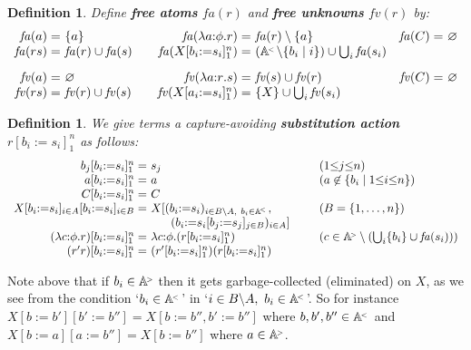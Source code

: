 \documentclass[submission,copyright]{eptcs}
\newtheorem{defn}[thrm]{Definition}
\newcommand{\rtm}{r}
\newcommand{\stm}{s}
\newcommand{\deffont}[1]{\textbf{#1}}
\newcommand{\f}[1]{\ensuremath{\text{$\mathit{#1}$}}}
\newcommand{\lam}[1]{\lambda{#1}.}
\newcommand{\ssm}{:=}
\newcommand{\fa}{\f{fa}}
\newcommand{\fv}{\f{fv}}
\newcommand\atomsdown{\mathbb A^{\hspace{-.3ex}{}_{{}^<}}}
\newcommand\atomsup{\mathbb A^{\hspace{-.3ex}{}_{{}^>}\!}} \newcommand\basesort{\tau}
\begin{document}
\begin{defn}
\label{defn.hole.free.atoms}
Define \deffont{free atoms} $\fa(\rtm)$ and \deffont{free unknowns} $\fv(\rtm)$ by:
\begin{displaymath}
\begin{array}{r@{\ }l@{\qquad}r@{\ }l@{\quad}r@{\ }l}
\fa(a) = & \{ a \}                               
& 
\fa(\lam{a{:}\phi}r) = & \fa(r) \setminus \{ a \}
&
\fa(C) = & \varnothing
\\
\fa(\rtm\stm) = & \fa(\rtm) \cup \fa(\stm) 
&
\fa(X[b_i{\ssm}s_i]_1^n) = & (\atomsdown{\setminus}\{b_i\mid i\})\cup\bigcup_i\fa(s_i)
\\[2ex]
\fv(a) = & \varnothing
& 
\fv(\lam{a{:}\rtm}\stm) = & \fv(\stm) \cup \fv(\rtm) 
&
\fv(C) = & \varnothing
\\
\fv(\rtm\stm) = & \fv(\rtm) \cup \fv(\stm)  
&
\fv(X[a_i{\ssm} s_i]_1^n) = & \{ X \}\cup\bigcup_i\fv(s_i) 
\end{array}
\end{displaymath}
\end{defn}

\begin{defn}
\label{defn.holes.sub}
We give terms a capture-avoiding \deffont{substitution action} $r[b_i\ssm s_i]_1^n$ as follows:
$$
\begin{array}{r@{\ }l@{\qquad}l}
b_j[b_i{\ssm} s_i]_1^n=&s_j & (1{\leq}j{\leq}n)
\\
a[b_i{\ssm} s_i]_1^n=&a & (a\not\in\{b_i\mid 1{\leq}i{\leq}n\})
\\
C[b_i{\ssm} s_i]_1^n=&C
\\
X[b_i{\ssm} s_i]_{i\in A}[b_i{\ssm} s_i]_{i\in B}=&
X[\begin{array}[t]{l} \!\!\! (b_i{\ssm}s_i)_{i\in B{\setminus}A,\ b_i{\in}\atomsdown}, \\ (b_i{\ssm}s_i[b_j{\ssm}s_j]_{j\in B})_{i\in A}] \end{array}
&(B=\{1,\dots,n\})
\\
(\lam{c{:}\phi}r)[b_i{\ssm}s_i]_1^n=&\lam{c{:}\phi}(r[b_i{\ssm}s_i]_1^n) &(c\in\atomsup\setminus(\bigcup_i\{b_i\}\cup\fa(s_i)))
\\
(r'r)[b_i{\ssm} s_i]_1^n=&(r'[b_i{\ssm}s_i]_1^n)(r[b_i{\ssm}s_i]_1^n)
\end{array}
$$ 
\end{defn}
\noindent Note above that if $b_i\in\atomsup$ then it gets garbage-collected (eliminated) on $X$, as we see from the condition `$b_i\in\atomsdown$' in `$i\in B{\setminus}A,\ b_i\in\atomsdown$'. 
So for instance $X[b{\ssm}b'][b'{\ssm}b'']=X[b{\ssm}b'',b'{\ssm}b'']$ where $b,b',b''\in\atomsdown$ and $X[b{\ssm}a][a{\ssm}b'']=X[b{\ssm}b'']$ where $a\in\atomsup$.
\end{document}
